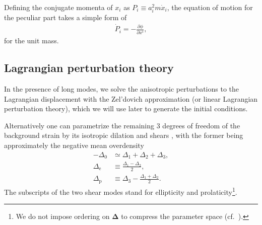\documentclass[a4paper,11pt]{article}
\newcommand{\vDelta}{{\bm\Delta}}
\begin{document}
Defining the conjugate momenta of $x_{i}$ as $P_{i}\equiv a_i^2 m \dot x_{i}$,
the equation of motion for the peculiar part takes a simple form of
\begin{align}
    \dot P_{i} = - \frac{\partial \phi}{\partial x^i},
    \label{eq:mod_EoM}
\end{align}
for the unit mass.



\subsection{Lagrangian perturbation theory}
\label{sub:lpt}

In the presence of long modes, we solve the anisotropic perturbations to the
Lagrangian displacement with the Zel'dovich approximation (or linear Lagrangian
perturbation theory), which we will use later to generate the initial
conditions.

Alternatively one can parametrize the remaining 3 degrees of freedom of the
background strain by its isotropic dilation and shears \cite{BondMyers96I},
with the former being approximately the negative mean overdensity
\begin{align}
    -\Delta_0 &\simeq \Delta_1 + \Delta_2 + \Delta_3, \nonumber\\
    \Delta_\mathrm{e} &\equiv \frac{\Delta_1 - \Delta_2}2, \nonumber\\
    \Delta_\mathrm{p} &\equiv \Delta_3 - \frac{\Delta_1 + \Delta_2}2.
\end{align}
The subscripts of the two shear modes stand for ellipticity and
prolaticity\footnote{We do not impose ordering on $\vDelta$ to compress the
parameter space (cf.\ \cite{BondMyers96I}).}.
\end{document}
